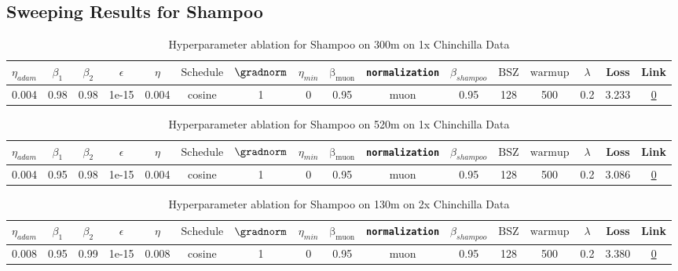 \subsection{Sweeping Results for Shampoo}%
\begin{table}[H]
\centering
\caption{Hyperparameter ablation for Shampoo on 300m on 1x Chinchilla Data}
\label{tab:ablation_shampoo_300m_1}
\begin{tabular}{cccccccccccccccc}
\toprule
$\eta_{adam}$ & $\beta_1$ & $\beta_2$ & $\epsilon$ & $\eta$ & $\mathrm{Schedule}$ & $\gradnorm$ & $\eta_{min}$ & $\mathrm{\beta_{muon}}$ & \texttt{normalization} & $\beta_{shampoo}$ & $\mathrm{BSZ}$ & $\mathrm{warmup}$ & $\lambda$ & Loss & Link \\
\midrule
0.004 & 0.98 & 0.98 & 1e-15 & 0.004 & cosine & 1 & 0 & 0.95 & muon & 0.95 & 128 & 500 & 0.2 & 3.233 & \href{https://wandb.ai/stanford-mercury/optimizer-scaling/runs/sweep-300m-6B-mudamha48f33lr0.004-alr0.004-wd0.2-minlr0-warmup50-0f876a}{0} \\
\midrule
\bottomrule
\end{tabular}
\end{table}

\begin{table}[H]
\centering
\caption{Hyperparameter ablation for Shampoo on 520m on 1x Chinchilla Data}
\label{tab:ablation_shampoo_520m_1}
\begin{tabular}{cccccccccccccccc}
\toprule
$\eta_{adam}$ & $\beta_1$ & $\beta_2$ & $\epsilon$ & $\eta$ & $\mathrm{Schedule}$ & $\gradnorm$ & $\eta_{min}$ & $\mathrm{\beta_{muon}}$ & \texttt{normalization} & $\beta_{shampoo}$ & $\mathrm{BSZ}$ & $\mathrm{warmup}$ & $\lambda$ & Loss & Link \\
\midrule
0.004 & 0.95 & 0.98 & 1e-15 & 0.004 & cosine & 1 & 0 & 0.95 & muon & 0.95 & 128 & 500 & 0.2 & 3.086 & \href{https://wandb.ai/stanford-mercury/optimizer-scaling/runs/sweep-520m-10B-mudamv87e43clr0.004-alr0.004-wd0.2-minlr0-warmup5-152be6}{0} \\
\midrule
\bottomrule
\end{tabular}
\end{table}

\begin{table}[H]
\centering
\caption{Hyperparameter ablation for Shampoo on 130m on 2x Chinchilla Data}
\label{tab:ablation_shampoo_130m_2}
\begin{tabular}{cccccccccccccccc}
\toprule
$\eta_{adam}$ & $\beta_1$ & $\beta_2$ & $\epsilon$ & $\eta$ & $\mathrm{Schedule}$ & $\gradnorm$ & $\eta_{min}$ & $\mathrm{\beta_{muon}}$ & \texttt{normalization} & $\beta_{shampoo}$ & $\mathrm{BSZ}$ & $\mathrm{warmup}$ & $\lambda$ & Loss & Link \\
\midrule
0.008 & 0.95 & 0.99 & 1e-15 & 0.008 & cosine & 1 & 0 & 0.95 & muon & 0.95 & 128 & 500 & 0.2 & 3.380 & \href{https://wandb.ai/stanford-mercury/optimizer-scaling/runs/sweep-130m-5B-mudamh504ba7lr0.008-alr0.008-wd0.2-minlr0-warmup50-9aff3d}{0} \\
\midrule
\bottomrule
\end{tabular}
\end{table}

